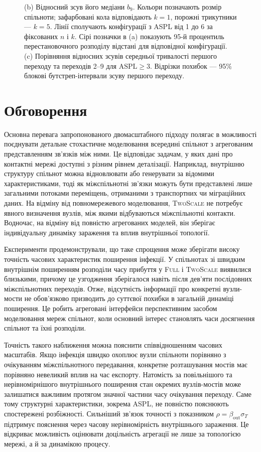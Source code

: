 \documentclass[a4paper,fleqn]{cas-sc}
\newcommand{\Full}{\textup{\textsc{Full}}}
\newcommand{\TS}{\textup{\textsc{TwoScale}}}
\begin{document}
\begin{figure}[tbp]
{(b) Відносний зсув його медіани $b_9$.
Кольори позначають розмір спільноти;
зафарбовані кола відповідають $k=1$,
порожні трикутники --- $k=5$.
Лінії сполучають конфігурації
з ASPL від 1 до 6 за фіксованих
$n$ і $k$. Сірі позначки в (a)
показують 95-й процентиль
перестановочного розподілу
відстані для відповідної конфігурації.
(c) Порівняння відносних зсувів
середньої тривалості першого
переходу та переходів 2--9
для $\mathrm{ASPL}\geq3$.
Відрізки похибок --- 95\%
блокові бутстреп-інтервали
зсуву першого переходу.
}
\label{fig:descriptor}
\end{figure}




\section{Обговорення}
\label{sec:discussion}

Основна перевага запропонованого
двомасштабного підходу полягає
в можливості поєднувати детальне
стохастичне моделювання всередині
спільнот з агрегованим представленням
зв'язків між ними. Це відповідає
задачам, у яких дані про контактні
мережі доступні з різним рівнем
деталізації. Наприклад, внутрішню
структуру спільнот можна відновлювати
або генерувати за відомими
характеристиками, тоді як
міжспільнотні зв'язки можуть
бути представлені лише загальними
потоками переміщень, отриманими
з транспортних чи міграційних даних.
На відміну від повномережевого
моделювання, \TS{} не потребує
явного визначення вузлів,
між якими відбуваються
міжспільнотні контакти.
Водночас, на відміну від
повністю агрегованих моделей,
він зберігає індивідуальну
динаміку зараження та вплив
внутрішньої топології.

Експерименти продемонстрували,
що таке спрощення може зберігати
високу точність часових характеристик
поширення інфекції. У спільнотах
зі швидким внутрішнім поширенням
розподіли часу прибуття у \Full{}
і \TS{} виявилися близькими,
причому це узгодження зберігалося
навіть після дев'яти послідовних
міжспільнотних переходів.
Отже, відсутність інформації
про конкретні вузли-мости
не обов'язково призводить
до суттєвої похибки
в загальній динаміці поширення.
Це робить агреговані інтерфейси
перспективним засобом
моделювання мереж спільнот,
коли основний інтерес становлять
часи досягнення спільнот
та їхні розподіли.

Точність такого наближення
можна пояснити співвідношенням
часових масштабів.
Якщо інфекція швидко охоплює
вузли спільноти порівняно
з очікуванням міжспільнотного
передавання, конкретне
розташування мостів має
порівняно невеликий вплив
на час експорту. Натомість
за повільнішого та нерівномірнішого
внутрішнього поширення
стан окремих вузлів-мостів
може залишатися важливим
протягом значної частини
часу очікування переходу.
Саме тому структурні
характеристики, зокрема ASPL,
не повністю пояснюють
спостережені розбіжності.
Сильніший зв'язок точності
з показником
$\rho=\beta_{\mathrm{out}}\sigma_T$
підтримує пояснення через
часову нерівномірність
внутрішнього зараження.
Це відкриває можливість
оцінювати доцільність
агрегації не лише за
топологією мережі,
а й за динамікою процесу.
\end{document}
